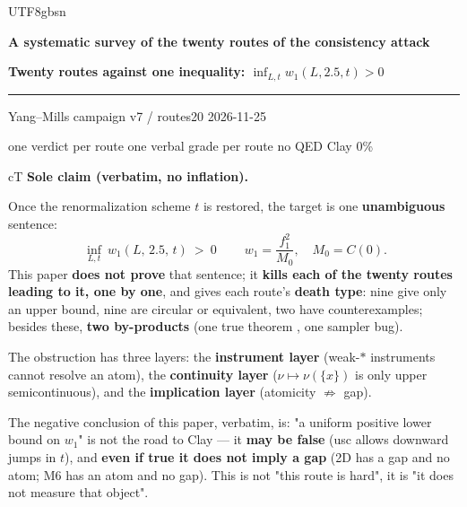\documentclass[11pt,a4paper]{article}
\newcommand{\labb}[2]{\fcolorbox{#1!35}{#1!8}{\textcolor{#1}{\textbf{\scriptsize #2}}}}
\newcommand{\LT}{\labb{cT}{T}}
\begin{document}
\begin{CJK}{UTF8}{gbsn}

\begin{center}
  \vspace*{0.1cm}
  {\LARGE\bfseries A systematic survey of the twenty routes of the consistency attack\par}
  \vspace{0.35em}
  {\large\bfseries Twenty routes against one inequality: $\displaystyle\inf_{L,t} w_1(L,2.5,t)>0$\par}
  \vspace{0.45em}
  \rule{0.62\textwidth}{0.6pt}\par
  \vspace{0.4em}
  {\small\color{black!60} Yang--Mills campaign \textperiodcentered{} v7 / routes20 \textperiodcentered{} 2026-11-25\par}
  \vspace{0.1em}
  {\small\color{black!60} one verdict per route \textperiodcentered{} one verbal grade per route \textperiodcentered{} no QED \textperiodcentered{} Clay 0\%\par}
\end{center}

\vspace{0.2em}

\begin{claimbox}{cT}
\textbf{Sole claim (verbatim, no inflation).}\hspace{0.35em}\LT
\par\smallskip
Once the renormalization scheme $t$ is restored, the target is one \textbf{unambiguous} sentence:
\[
  \boxed{\ \inf_{L,t}\ w_1(L,\,2.5,\,t)\ >\ 0\ }\qquad
  w_1=\frac{f_1^2}{M_0},\quad M_0=C(0).
\]
This paper \textbf{does not prove} that sentence; it \textbf{kills each of the twenty routes leading to it, one by one}, and gives each route's \textbf{death type}:
nine give only an upper bound, nine are circular or equivalent, two have counterexamples; besides these, \textbf{two by-products} (one true theorem \LT, one sampler bug).
\par\smallskip
The obstruction has three layers: the \textbf{instrument layer} (weak-$*$ instruments cannot resolve an atom), the \textbf{continuity layer} ($\nu\mapsto\nu(\{x\})$ is only upper semicontinuous),
and the \textbf{implication layer} (atomicity $\not\Rightarrow$ gap).
\par\smallskip
{\footnotesize The negative conclusion of this paper, verbatim, is: "a uniform positive lower bound on $w_1$" is not the road to Clay --- it \textbf{may be false} (usc allows downward jumps in $t$),
and \textbf{even if true it does not imply a gap} (2D has a gap and no atom; M6 has an atom and no gap). This is not "this route is hard", it is "it does not measure that object".}
\end{claimbox}


\end{CJK}
\end{document}
